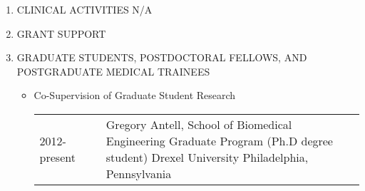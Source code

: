 \documentclass[a4paper,10pt]{article}
\begin{document}
\begin{enumerate}
\begin{itemize}
\begin{longtable}{p{}p{}p{}}
  \end{longtable}
 \end{itemize}
 \item CLINICAL ACTIVITIES \newline
 N/A
 \item GRANT SUPPORT
 \item GRADUATE STUDENTS, POSTDOCTORAL FELLOWS, AND   POSTGRADUATE MEDICAL TRAINEES
 \begin{itemize}
  \item[] Co-Supervision of Graduate Student Research
    \begin{longtable}{p{}p{}p{}}
  2012-present & & Gregory Antell, School of Biomedical Engineering \newline Graduate Program (Ph.D degree student) \newline Drexel University \newline Philadelphia, Pennsylvania
  \end{longtable}
 \end{itemize}


\end{enumerate}
\end{document}
